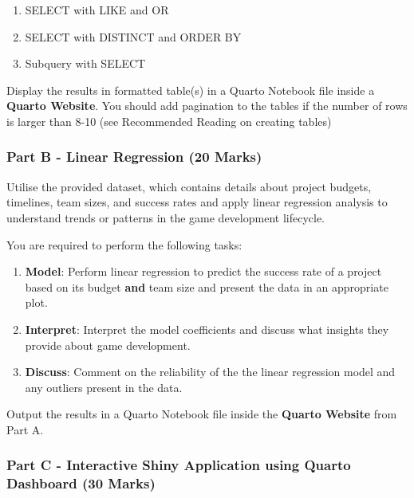 \documentclass[
  letterpaper,
  DIV=11,
  numbers=noendperiod]{scrartcl}
\providecommand{\tightlist}{%
  \setlength{\itemsep}{0pt}\setlength{\parskip}{0pt}}\usepackage{longtable,booktabs,array}
\begin{document}
\begin{enumerate}
\def\labelenumi{\arabic{enumi}.}
\tightlist
\item
  SELECT with LIKE and OR
\item
  SELECT with DISTINCT and ORDER BY
\item
  Subquery with SELECT
\end{enumerate}

Display the results in formatted table(s) in a Quarto Notebook file
inside a \textbf{Quarto Website}. You should add pagination to the
tables if the number of rows is larger than 8-10 (see Recommended
Reading on creating tables)

\subsubsection{Part B - Linear Regression (20
Marks)}\label{part-b---linear-regression-20-marks}

Utilise the provided dataset, which contains details about project
budgets, timelines, team sizes, and success rates and apply linear
regression analysis to understand trends or patterns in the game
development lifecycle.

You are required to perform the following tasks:

\begin{enumerate}
\def\labelenumi{\arabic{enumi}.}
\tightlist
\item
  \textbf{Model}: Perform linear regression to predict the success rate
  of a project based on its budget \textbf{and} team size and present
  the data in an appropriate plot.
\item
  \textbf{Interpret}: Interpret the model coefficients and discuss what
  insights they provide about game development.
\item
  \textbf{Discuss}: Comment on the reliability of the the linear
  regression model and any outliers present in the data.
\end{enumerate}

Output the results in a Quarto Notebook file inside the \textbf{Quarto
Website} from Part A.

\subsubsection{Part C - Interactive Shiny Application using Quarto
Dashboard (30
Marks)}\label{part-c---interactive-shiny-application-using-quarto-dashboard-30-marks}
\end{document}
